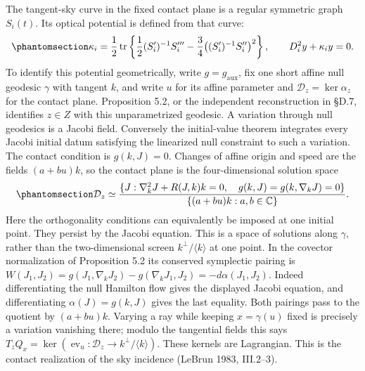 \documentclass[
  english,
  11pt,
  reqno]{amsart}
\begin{document}
The tangent-sky curve in the fixed contact plane is a regular symmetric
graph \(S_i(t)\). Its optical potential is defined from that curve:
\begin{equation}\protect\phantomsection\label{eq:gg-optical-equation}{
 \kappa_i=\frac12\operatorname{tr}
   \left\{\frac12(S_i')^{-1}S_i'''
           -\frac34\big((S_i')^{-1}S_i''\big)^2\right\},
 \qquad D_i^2y+\kappa_i y=0 .
}\end{equation} To identify this potential geometrically, write
\(g=g_{\mathrm{aux}}\), fix one short affine null geodesic \(\gamma\)
with tangent \(k\), and write \(u\) for its affine parameter and
\(\mathcal D_z=\ker\alpha_z\) for the contact plane. Proposition 5.2, or
the independent reconstruction in §D.7, identifies \(z\in Z\) with this
unparametrized geodesic. A variation through null geodesics is a Jacobi
field. Conversely the initial-value theorem integrates every Jacobi
initial datum satisfying the linearized null constraint to such a
variation. The contact condition is \(g(k,J)=0\). Changes of affine
origin and speed are the fields \((a+bu)k\), so the contact plane is the
four-dimensional solution space
\begin{equation}\protect\phantomsection\label{eq:gg-contact-jacobi-solution-space}{
 \mathcal D_z\simeq
 \frac{\{J:\nabla_k^2J+R(J,k)k=0,\quad
             g(k,J)=g(k,\nabla_kJ)=0\}}
      {\{(a+bu)k:a,b\in\mathbb C\}}.
}\end{equation} Here the orthogonality conditions can equivalently be
imposed at one initial point. They persist by the Jacobi equation. This
is a space of solutions along \(\gamma\), rather than the
two-dimensional screen \(k^\perp/\langle k\rangle\) at one point. In the
covector normalization of Proposition 5.2 its conserved symplectic
pairing is
\(W(J_1,J_2)=g(J_1,\nabla_kJ_2)-g(\nabla_kJ_1,J_2)=-d\alpha(J_1,J_2)\).
Indeed differentiating the null Hamilton flow gives the displayed Jacobi
equation, and differentiating \(\alpha(J)=g(k,J)\) gives the last
equality. Both pairings pass to the quotient by \((a+bu)k\). Varying a
ray while keeping \(x=\gamma(u)\) fixed is precisely a variation
vanishing there; modulo the tangential fields this says
\(T_zQ_x=\ker(\operatorname{ev}_u:\mathcal D_z\to k^\perp/\langle k\rangle)\).
These kernels are Lagrangian. This is the contact realization of the sky
incidence (LeBrun 1983, III.2--3).
\end{document}
